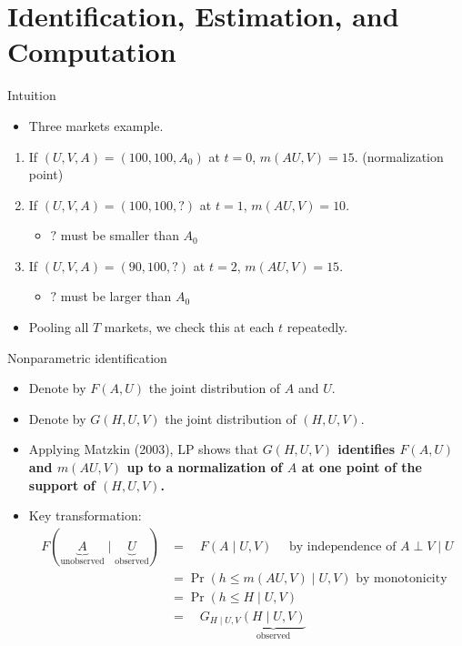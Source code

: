 \documentclass[aspectratio=169]{beamer}
\begin{document}
\section{Identification, Estimation, and Computation}

\begin{frame}{Intuition}
    \begin{itemize}
    \item Three markets example.
    \end{itemize}
    \begin{enumerate}
        \item If $(U,V,A)=(100,100,A_0)$ at $t=0$, $m(AU,V)=15$. (normalization point)\pause
        \item If $(U,V,A)=(100,100,?)$ at $t=1$, $m(AU,V)=10$.\pause
        \begin{itemize}
            \item $?$ must be smaller than $A_0$\pause
        \end{itemize}
        \item If $(U,V,A)=(90,100,?)$ at $t=2$, $m(AU,V)=15$.\pause
        \begin{itemize}
            \item $?$ must be larger than $A_0$\pause
        \end{itemize}
    \end{enumerate}
    \begin{itemize}
        \item Pooling all $T$ markets, we check this at each $t$ repeatedly.
    \end{itemize}
\end{frame}

\begin{frame}{Nonparametric identification}
    \begin{itemize}
    \item Denote by $F(A, U)$ the joint distribution of $A$ and $U$. 
    \item Denote by $G(H, U, V)$ the joint distribution of $(H,U,V)$.
    \item Applying Matzkin (2003), LP shows that \textbf{$G(H, U, V)$ identifies $F(A, U)$ and $m(A U, V)$ up to a normalization of $A$ at one point of the support of $(H, U, V)$.}\pause
    \item Key transformation:
    \begin{align*}
        F(\underbrace{A}_{\text{unobserved}} \mid \underbrace{U}_{\text{observed}})&=\quad F(A \mid U, V) \quad \text { by independence of } A \perp V \mid U \\
        & =\operatorname{Pr}(h \leq m(A U, V) \mid U, V) \text { by monotonicity } \\ 
        & =\operatorname{Pr}(h \leq H \mid U, V) \\ 
        & =\quad G_{H \mid U, V}\underbrace{(H \mid U, V)}_{\text{observed}}
    \end{align*}
    \end{itemize}
\end{frame}
\end{document}
